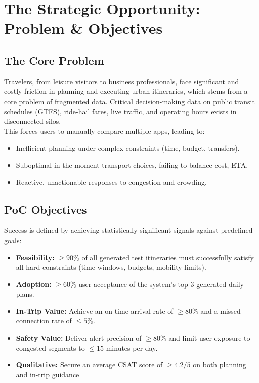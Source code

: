 \chapter{The Strategic Opportunity: Problem \& Objectives}

\section{The Core Problem}
Travelers, from leisure visitors to business professionals, face significant and costly friction in planning and executing urban itineraries, which stems from a core problem of fragmented data. Critical decision-making data on public transit schedules (GTFS), ride-hail fares, live traffic, and operating hours exists in disconnected silos.
\\
This forces users to manually compare multiple apps, leading to:
\begin{itemize}
    \item  Inefficient planning under complex constraints (time, budget, transfers).
    \item Suboptimal in-the-moment transport choices, failing to balance cost, ETA.
    \item Reactive, unactionable responses to congestion and crowding.
\end{itemize}

\section{PoC Objectives}
Success is defined by achieving statistically significant signals against predefined goals: 
\begin{itemize}
    \item \textbf{Feasibility:} $\geq90\%$ of all generated test itineraries must successfully satisfy all hard constraints (time windows, budgets, mobility limits).
    \item \textbf{Adoption:} $\geq60\%$ user acceptance of the system’s top-3 generated daily plans.
    \item \textbf{In-Trip Value:} Achieve an on-time arrival rate of $\geq80\%$ and a missed-connection rate of $\leq5\%$.
    \item \textbf{Safety Value:} Deliver alert precision of $\geq80\%$ and limit user exposure to congested segments to $\leq15$ minutes per day.
    \item \textbf{Qualitative:} Secure an average CSAT score of $\geq4.2/5$ on both planning and in-trip guidance
\end{itemize}




\glsresetall



